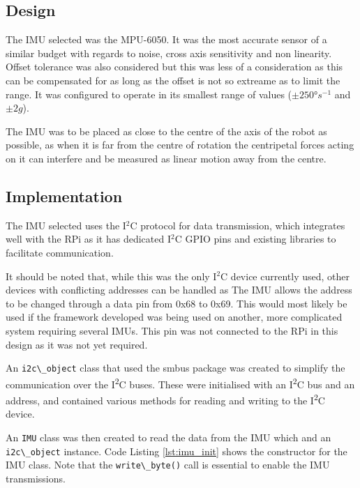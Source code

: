 \subsection{Design}\label{elec/imu/design}
The IMU selected was the MPU-6050. It was the most accurate sensor of a similar budget with regards to noise, cross axis sensitivity and non linearity. Offset tolerance was also considered but this was less of a consideration as this can be compensated for as long as the offset is not so extreame as to limit the range. It was configured to operate in its smallest range of values ($\pm\ang{250}s^{-1}$ and $\pm2g$\cite{}).

The IMU was to be placed as close to the centre of the axis of the robot as possible, as when it is far from the centre of rotation the centripetal forces acting on it can interfere and be measured as linear motion away from the centre.  

\subsection{Implementation}\label{elec/imu/impl}

The IMU selected uses the I$^2$C protocol for data transmission, which integrates well with the RPi as it has dedicated I$^2$C GPIO pins and existing libraries to facilitate communication. 

It should be noted that, while this was the only I$^2$C device currently used, other devices with conflicting addresses can be handled as The IMU allows the address to be changed through a data pin from 0x68 to 0x69. This would most likely be used if the framework developed was being used on another, more complicated system requiring several IMUs. This pin was not connected to the RPi in this design as it was not yet required. 

An \verb|i2c\_object| class that used the smbus package was created to simplify the communication over the I\textsuperscript{2}C buses. These were initialised with an I\textsuperscript{2}C bus and an address, and contained various methods for reading and writing to the I\textsuperscript{2}C device. 


An \verb|IMU| class was then created to read the data from the IMU which and an \verb|i2c\_object| instance. Code Listing \ref{lst:imu_init} shows the constructor for the IMU class. Note that the \verb|write\_byte()| call is essential to enable the IMU transmissions. 

